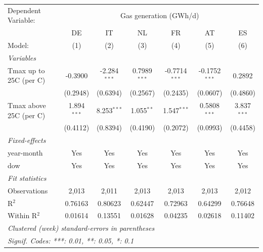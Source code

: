 
\begingroup
\centering
\begin{tabular}{lcccccc}
   \tabularnewline \midrule \midrule
   Dependent Variable: & \multicolumn{6}{c}{Gas generation (GWh/d)}\\
                          & DE            & IT             & NL             & FR              & AT              & ES \\   
   Model:                 & (1)           & (2)            & (3)            & (4)             & (5)             & (6)\\  
   \midrule
   \emph{Variables}\\
   Tmax up to 25C (per C) & -0.3900       & -2.284$^{***}$ & 0.7989$^{***}$ & -0.7714$^{***}$ & -0.1752$^{***}$ & 0.2892\\   
                          & (0.2948)      & (0.6394)       & (0.2567)       & (0.2435)        & (0.0607)        & (0.4860)\\   
   Tmax above 25C (per C) & 1.894$^{***}$ & 8.253$^{***}$  & 1.055$^{**}$   & 1.547$^{***}$   & 0.5808$^{***}$  & 3.837$^{***}$\\   
                          & (0.4112)      & (0.8394)       & (0.4190)       & (0.2072)        & (0.0993)        & (0.4458)\\   
   \midrule
   \emph{Fixed-effects}\\
   year-month             & Yes           & Yes            & Yes            & Yes             & Yes             & Yes\\  
   dow                    & Yes           & Yes            & Yes            & Yes             & Yes             & Yes\\  
   \midrule
   \emph{Fit statistics}\\
   Observations           & 2,013         & 2,011          & 2,013          & 2,013           & 2,013           & 2,012\\  
   R$^2$                  & 0.76163       & 0.80623        & 0.62447        & 0.72963         & 0.64299         & 0.76648\\  
   Within R$^2$           & 0.01614       & 0.13551        & 0.01628        & 0.04235         & 0.02618         & 0.11402\\  
   \midrule \midrule
   \multicolumn{7}{l}{\emph{Clustered (week) standard-errors in parentheses}}\\
   \multicolumn{7}{l}{\emph{Signif. Codes: ***: 0.01, **: 0.05, *: 0.1}}\\
\end{tabular}
\par\endgroup


